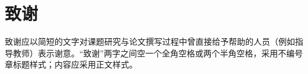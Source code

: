 \chapter*{\texorpdfstring{致\quad 谢}{致谢}}

致谢应以简短的文字对课题研究与论文撰写过程中曾直接给予帮助的人员（例如指导教师）表示谢意。“致谢”两字之间空一个全角空格或两个半角空格，采用不编号章标题样式；内容应采用正文样式。
